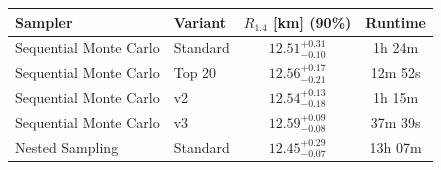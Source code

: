 \renewcommand{\arraystretch}{1.4}
\begin{tabular}{l l c c}
    \hline
    Sampler & Variant & $R_{1.4}$ [km] (90\%) & Runtime \\
    \hline
    Sequential Monte Carlo & Standard & $12.51^{+0.31}_{-0.10}$ & 1h 24m \\
    Sequential Monte Carlo & Top 20 & $12.56^{+0.17}_{-0.21}$ & 12m 52s \\
    Sequential Monte Carlo & v2 & $12.54^{+0.13}_{-0.18}$ & 1h 15m \\
    Sequential Monte Carlo & v3 & $12.59^{+0.09}_{-0.08}$ & 37m 39s \\
    Nested Sampling & Standard & $12.45^{+0.29}_{-0.07}$ & 13h 07m \\
    \hline
\end{tabular}
